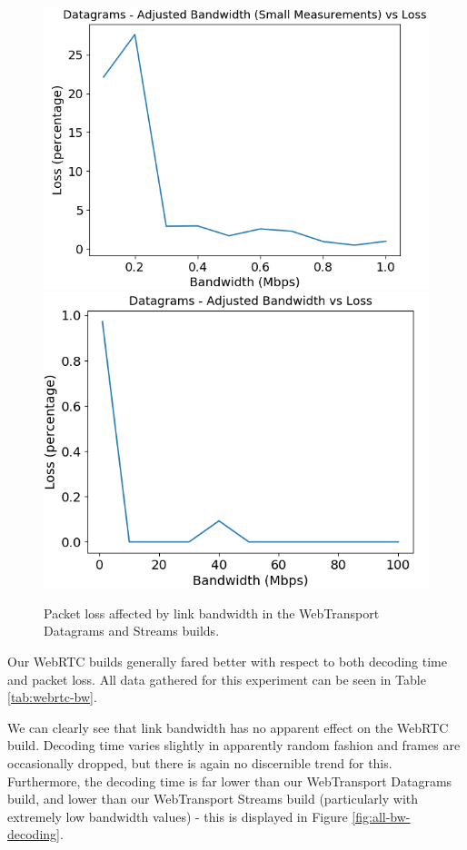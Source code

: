 \begin{figure}[h]
    \centering
     \includegraphics[width=0.49\linewidth]{images/bandwidth/dg-bw-loss-small.png}    
    \includegraphics[width=0.49\linewidth]{images/bandwidth/dg-bw-loss.png}    
    \caption{Packet loss affected by link bandwidth in the WebTransport Datagrams and Streams builds.}

    \label{fig:dg-bw-loss} 
\end{figure}

Our WebRTC builds generally fared better with respect to both decoding time and packet loss. All data gathered for this experiment can be seen in Table \ref{tab:webrtc-bw}.

We can clearly see that link bandwidth has no apparent effect on the WebRTC build. Decoding time varies slightly in apparently random fashion and frames are occasionally dropped, but there is again no discernible trend for this. Furthermore, the decoding time is far lower than our WebTransport Datagrams build, and lower than our WebTransport Streams build (particularly with extremely low bandwidth values) - this is displayed in Figure \ref{fig:all-bw-decoding}.


